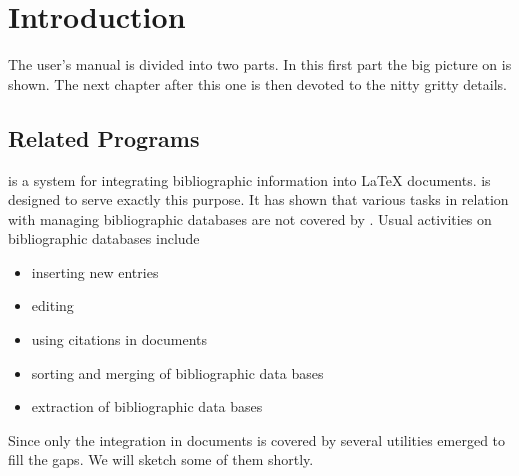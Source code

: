 \documentclass[11pt,a4paper]{scrbook}
\begin{document}
\chapter{Introduction}

The user's manual is divided into two parts. In this first part the big
picture on \BibTool{} is shown. The next chapter after this one is then
devoted to the nitty gritty details.


\section{Related Programs}

\BibTeX{} \cite{lamport:latex,patashnik:bibtexing,patashnik:designing} is a
system for integrating bibliographic information into \LaTeX{}
\cite{lamport:latex} documents. \BibTeX{} is designed to serve exactly this
purpose. It has shown that various tasks in relation with managing
bibliographic databases are not covered by \BibTeX. Usual activities on
bibliographic databases include
\begin{itemize}
  \item inserting new entries
  \item editing
  \item using citations in documents
  \item sorting and merging of bibliographic data bases
  \item extraction of bibliographic data bases
\end{itemize}
%
Since only the integration in documents is covered by \BibTeX{} several
utilities emerged to fill the gaps. We will sketch some of them shortly.
%
\end{document}
